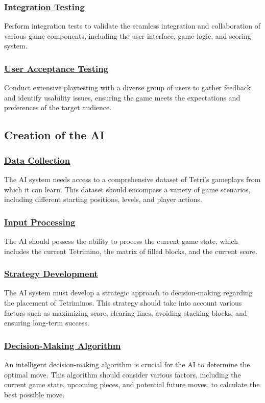 \documentclass[conference]{IEEEtran}
\begin{document}
\subsubsection{\underline{Integration Testing}}
Perform integration tests to validate the seamless integration and collaboration of various game components, including the user interface, game logic, and scoring system.
\subsubsection{\underline{User Acceptance Testing}}
Conduct extensive playtesting with a diverse group of users to gather feedback and identify usability issues, ensuring the game meets the expectations and preferences of the target audience.

\subsection{Creation of the AI}

\subsubsection{\underline{Data Collection}}
The AI system needs access to a comprehensive dataset of Tetri's gameplays from which it can learn. This dataset should encompass a variety of game scenarios, including different starting positions, levels, and player actions.
\subsubsection{\underline{Input Processing}}
The AI should possess the ability to process the current game state, which includes the current Tetrimino, the matrix of filled blocks, and the current score.
\subsubsection{\underline{Strategy Development}}
The AI system must develop a strategic approach to decision-making regarding the placement of Tetriminos. This strategy should take into account various factors such as maximizing score, clearing lines, avoiding stacking blocks, and ensuring long-term success.
\subsubsection{\underline{Decision-Making Algorithm}}
An intelligent decision-making algorithm is crucial for the AI to determine the optimal move. This algorithm should consider various factors, including the current game state, upcoming pieces, and potential future moves, to calculate the best possible move.
\end{document}
